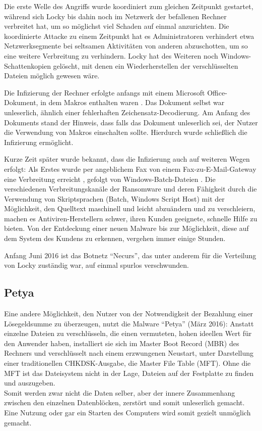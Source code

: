 Die erste Welle des Angriffs wurde koordiniert zum gleichen Zeitpunkt gestartet, während sich Locky bis dahin noch im Netzwerk der befallenen Rechner verbreitet hat, um so möglichst viel Schaden auf einmal anzurichten. Die koordinierte Attacke zu einem Zeitpunkt hat es Administratoren verhindert etwa Netzwerksegmente bei seltsamen Aktivitäten von anderen abzuschotten, um so eine weitere Verbreitung zu verhindern. Locky hat des Weiteren noch Windows-Schattenkopien gelöscht, mit denen ein Wiederherstellen der verschlüsselten Dateien möglich gewesen wäre. \cite{locky:start}

Die Infizierung der Rechner erfolgte anfangs mit einem Microsoft Office-Dokument, in dem Makros enthalten waren \cite{locky:infection}. Das Dokument selbst war unleserlich, ähnlich einer fehlerhaften Zeichensatz-Decodierung. Am Anfang des Dokuments stand der Hinweis, dass falls das Dokument unleserlich sei, der Nutzer die Verwendung von Makros einschalten sollte. Hierdurch wurde schließlich die Infizierung ermöglicht.

Kurze Zeit später wurde bekannt, dass die Infizierung auch auf weiteren Wegen erfolgt: Als Erstes wurde per angeblichem Fax von einem Fax-zu-E-Mail-Gateway eine Verbreitung erreicht \cite{locky:fax}, gefolgt von Windows-Batch-Dateien \cite{locky:batch}. Die verschiedenen Verbreitungskanäle der Ransomware und deren Fähigkeit durch die Verwendung von Skriptsprachen (Batch, Windows Script Host) mit der Möglichkeit, den Quelltext maschinell und leicht abzuändern und zu verschleiern, machen es Antiviren-Herstellern schwer, ihren Kunden geeignete, schnelle Hilfe zu bieten. Von der Entdeckung einer neuen Malware bis zur Möglichkeit, diese auf dem System des Kundens zu erkennen, vergehen immer einige Stunden.

Anfang Juni 2016 ist das Botnetz ``Necurs'', das unter anderem für die Verteilung von Locky zuständig war, auf einmal spurlos verschwunden. \cite{locky:end}

		
\subsection{Petya}
Eine andere Möglichkeit, den Nutzer von der Notwendigkeit der Bezahlung einer Lösegeldsumme zu überzeugen, nutzt die Malware ``Petya'' (März 2016): Anstatt einzelne Dateien zu verschlüsseln, die einen vermuteten, hohen ideellen Wert für den Anwender haben, installiert sie sich im Master Boot Record (MBR) des Rechners und verschlüsselt nach einem erzwungenen Neustart, unter Darstellung einer traditionellen CHKDSK-Ausgabe, die Master File Table (MFT). Ohne die MFT ist das Dateisystem nicht in der Lage, Dateien auf der Festplatte zu finden und auszugeben. \cite{petya:start} \\
Somit werden zwar nicht die Daten selber, aber der innere Zusammenhang zwischen den einzelnen Datenblöcken, zerstört und somit unleserlich gemacht. Eine Nutzung oder gar ein Starten des Computers wird somit gezielt unmöglich gemacht.

